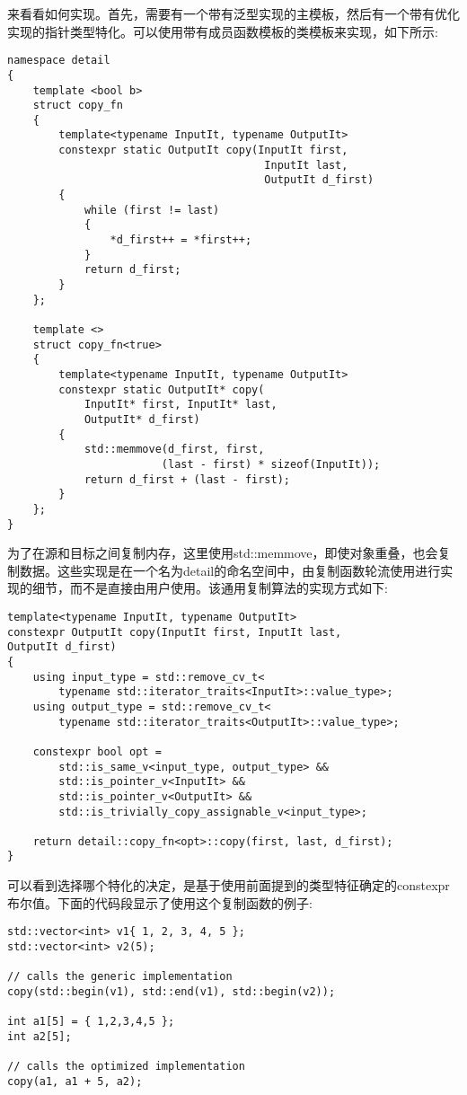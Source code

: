 来看看如何实现。首先，需要有一个带有泛型实现的主模板，然后有一个带有优化实现的指针类型特化。可以使用带有成员函数模板的类模板来实现，如下所示:

\begin{lstlisting}[style=styleCXX]
namespace detail
{
	template <bool b>
	struct copy_fn
	{
		template<typename InputIt, typename OutputIt>
		constexpr static OutputIt copy(InputIt first,
										InputIt last,
										OutputIt d_first)
		{
			while (first != last)
			{
				*d_first++ = *first++;
			}
			return d_first;
		}
	};

	template <>
	struct copy_fn<true>
	{
		template<typename InputIt, typename OutputIt>
		constexpr static OutputIt* copy(
			InputIt* first, InputIt* last,
			OutputIt* d_first)
		{
			std::memmove(d_first, first,
						(last - first) * sizeof(InputIt));
			return d_first + (last - first);
		}
	};
}
\end{lstlisting}

为了在源和目标之间复制内存，这里使用std::memmove，即使对象重叠，也会复制数据。这些实现是在一个名为detail的命名空间中，由复制函数轮流使用进行实现的细节，而不是直接由用户使用。该通用复制算法的实现方式如下:

\begin{lstlisting}[style=styleCXX]
template<typename InputIt, typename OutputIt>
constexpr OutputIt copy(InputIt first, InputIt last,
OutputIt d_first)
{
	using input_type = std::remove_cv_t<
		typename std::iterator_traits<InputIt>::value_type>;
	using output_type = std::remove_cv_t<
		typename std::iterator_traits<OutputIt>::value_type>;
		
	constexpr bool opt =
		std::is_same_v<input_type, output_type> &&
		std::is_pointer_v<InputIt> &&
		std::is_pointer_v<OutputIt> &&
		std::is_trivially_copy_assignable_v<input_type>;
		
	return detail::copy_fn<opt>::copy(first, last, d_first);
}
\end{lstlisting}

可以看到选择哪个特化的决定，是基于使用前面提到的类型特征确定的constexpr布尔值。下面的代码段显示了使用这个复制函数的例子:

\begin{lstlisting}[style=styleCXX]
std::vector<int> v1{ 1, 2, 3, 4, 5 };
std::vector<int> v2(5);

// calls the generic implementation
copy(std::begin(v1), std::end(v1), std::begin(v2));

int a1[5] = { 1,2,3,4,5 };
int a2[5];

// calls the optimized implementation
copy(a1, a1 + 5, a2);
\end{lstlisting}

